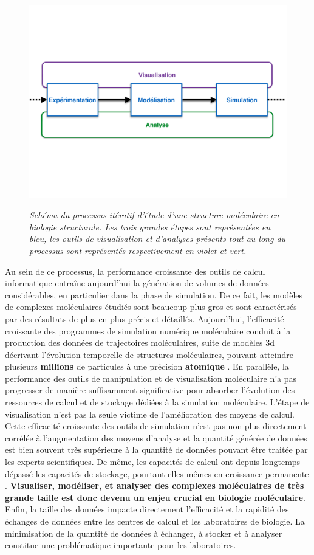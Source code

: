 \begin{figure}[h]
  \centering
  {\includegraphics[width=.75\linewidth]{./figures/ch1/process_bio_struct}}
    \caption{{\it Schéma du processus itératif d'étude d'une structure moléculaire en biologie structurale. Les trois grandes étapes sont représentées en bleu, les outils de visualisation et d'analyses présents tout au long du processus sont représentés respectivement en violet et vert.}}
  \label{Fig:process_bio_struct}
  \hspace{0.2cm}
\end{figure}

Au sein de ce processus, la performance croissante des outils de calcul informatique entraîne aujourd'hui la génération de volumes de données considérables, en particulier dans la phase de simulation. De ce fait, les modèles de complexes moléculaires étudiés sont beaucoup plus gros et sont caractérisés par des résultats de plus en plus précis et détaillés. Aujourd'hui, l'efficacité croissante des programmes de simulation numérique moléculaire conduit à la production des données de trajectoires moléculaires, suite de modèles 3d décrivant l'évolution temporelle de structures moléculaires, pouvant atteindre plusieurs \textbf{millions} de particules à une précision \textbf{atomique} \cite{sanbonmatsu2013molecular}. En parallèle, la performance des outils de manipulation et de visualisation moléculaire n'a pas progresser de manière suffisamment significative pour absorber l'évolution des ressources de calcul et de stockage dédiées à la simulation moléculaire. L'étape de visualisation n'est pas la seule victime de l'amélioration des moyens de calcul. Cette efficacité croissante des outils de simulation n'est pas non plus directement corrélée à l'augmentation des moyens d'analyse et la quantité générée de données est bien souvent très supérieure à la quantité de données pouvant être traitée par les experts scientifiques. De même, les capacités de calcul ont depuis longtemps dépassé les capacités de stockage, pourtant elles-mêmes en croissance permanente \cite{zimmerman2014data}. \textbf{Visualiser, modéliser, et analyser des complexes moléculaires de très grande taille est donc devenu un enjeu crucial en biologie moléculaire}. Enfin, la taille des données impacte directement l'efficacité et la rapidité des échanges de données entre les centres de calcul et les laboratoires de biologie. La minimisation de la quantité de données à échanger, à stocker et à analyser constitue une problématique importante pour les laboratoires.

